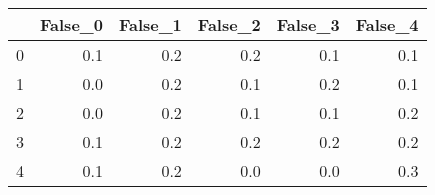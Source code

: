 \begin{tabular}{lrrrrr}
\toprule
{} &  False\_0 &  False\_1 &  False\_2 &  False\_3 &  False\_4 \\ \hline
\midrule
0 &      0.1 &      0.2 &      0.2 &      0.1 &      0.1 \\ \hline
1 &      0.0 &      0.2 &      0.1 &      0.2 &      0.1 \\ \hline
2 &      0.0 &      0.2 &      0.1 &      0.1 &      0.2 \\ \hline
3 &      0.1 &      0.2 &      0.2 &      0.2 &      0.2 \\ \hline
4 &      0.1 &      0.2 &      0.0 &      0.0 &      0.3 \\ \hline
\bottomrule
\end{tabular}
